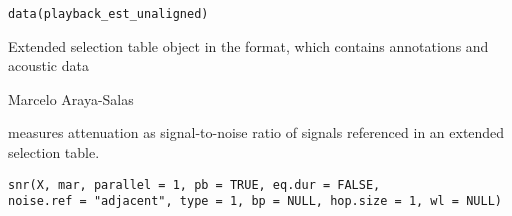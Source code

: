 \documentclass[letterpaper]{book}
\begin{document}
%
\begin{Usage}
\begin{verbatim}
data(playback_est_unaligned)
\end{verbatim}
\end{Usage}
%
\begin{Format}
Extended selection table object in the  format, which contains annotations and acoustic data
\end{Format}
%
\begin{Source}\relax
Marcelo Araya-Salas
\end{Source}
%
\begin{Description}\relax
{} measures attenuation as signal-to-noise ratio of signals referenced in an extended selection table.
\end{Description}
%
\begin{Usage}
\begin{verbatim}
snr(X, mar, parallel = 1, pb = TRUE, eq.dur = FALSE,
noise.ref = "adjacent", type = 1, bp = NULL, hop.size = 1, wl = NULL)
\end{verbatim}
\end{Usage}
%
\end{document}
